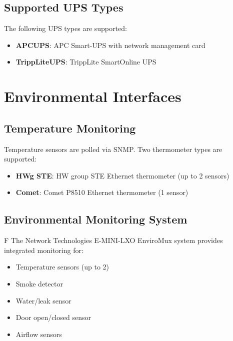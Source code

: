 \subsection{Supported UPS Types}

The following UPS types are supported:

\begin{itemize}
    \item \textbf{APCUPS}: APC Smart-UPS with network management card
    \item \textbf{TrippLiteUPS}: TrippLite SmartOnline UPS
\end{itemize}

\section{Environmental Interfaces}

\subsection{Temperature Monitoring}

Temperature sensors are polled via SNMP. Two thermometer types are supported:

\begin{itemize}
    \item \textbf{HWg STE}: HW group STE Ethernet thermometer (up to 2 sensors)
    \item \textbf{Comet}: Comet P8510 Ethernet thermometer (1 sensor)
\end{itemize}

\subsection{Environmental Monitoring System}

\begin{newInVersion}{F}
The Network Technologies E-MINI-LXO EnviroMux system provides integrated monitoring for:
\begin{itemize}
    \item Temperature sensors (up to 2)
    \item Smoke detector
    \item Water/leak sensor
    \item Door open/closed sensor
    \item Airflow sensors
\end{itemize}
\end{newInVersion}

